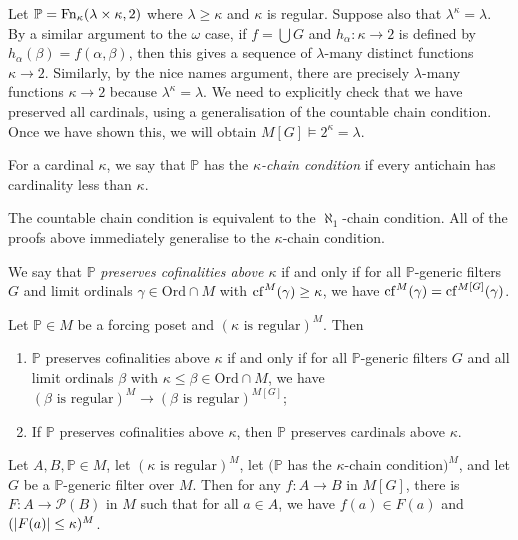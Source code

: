 Let \( \mathbb P = \operatorname{Fn}_\kappa(\lambda \times \kappa, 2) \) where \( \lambda \geq \kappa \) and \( \kappa \) is regular.
Suppose also that \( \lambda^\kappa = \lambda \).
By a similar argument to the \( \omega \) case, if \( f = \bigcup G \) and \( h_\alpha : \kappa \to 2 \) is defined by \( h_\alpha(\beta) = f(\alpha, \beta) \), then this gives a sequence of \( \lambda \)-many distinct functions \( \kappa \to 2 \).
Similarly, by the nice names argument, there are precisely \( \lambda \)-many functions \( \kappa \to 2 \) because \( \lambda^\kappa = \lambda \).
We need to explicitly check that we have preserved all cardinals, using a generalisation of the countable chain condition.
Once we have shown this, we will obtain \( M[G] \vDash 2^\kappa = \lambda \).
\begin{definition}
    For a cardinal \( \kappa \), we say that \( \mathbb P \) has the \emph{\( \kappa \)-chain condition} if every antichain has cardinality less than \( \kappa \).
\end{definition}
The countable chain condition is equivalent to the \( \aleph_1 \)-chain condition.
All of the proofs above immediately generalise to the \( \kappa \)-chain condition.
\begin{definition}
    We say that \( \mathbb P \) \emph{preserves cofinalities above \( \kappa \)} if and only if for all \( \mathbb P \)-generic filters \( G \) and limit ordinals \( \gamma \in \mathrm{Ord} \cap M \) with \( \operatorname{cf}^M(\gamma) \geq \kappa \), we have \( \operatorname{cf}^M(\gamma) = \operatorname{cf}^{M[G]}(\gamma) \).
\end{definition}
\begin{lemma}
    Let \( \mathbb P \in M \) be a forcing poset and \( (\kappa \text{ is regular})^M \).
    Then
    \begin{enumerate}
        \item \( \mathbb P \) preserves cofinalities above \( \kappa \) if and only if for all \( \mathbb P \)-generic filters \( G \) and all limit ordinals \( \beta \) with \( \kappa \leq \beta \in \mathrm{Ord} \cap M \), we have \( (\beta \text{ is regular})^M \to (\beta \text{ is regular})^{M[G]} \);
        \item If \( \mathbb P \) preserves cofinalities above \( \kappa \), then \( \mathbb P \) preserves cardinals above \( \kappa \).
    \end{enumerate}
\end{lemma}
\begin{lemma}
    Let \( A, B, \mathbb P \in M \), let \( (\kappa \text{ is regular})^M \), let \( (\mathbb P \) has the \( \kappa \)-chain condition\( )^M \), and let \( G \) be a \( \mathbb P \)-generic filter over \( M \).
    Then for any \( f : A \to B \) in \( M[G] \), there is \( F : A \to \mathcal P(B) \) in \( M \) such that for all \( a \in A \), we have \( f(a) \in F(a) \) and \( (\abs{F(a)} \leq \kappa)^M \).
\end{lemma}
